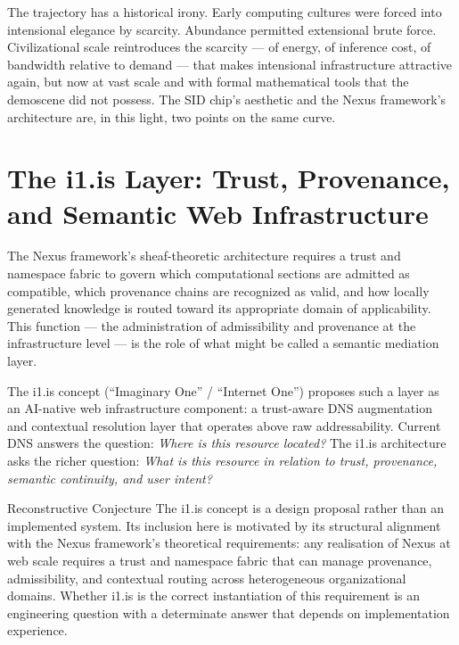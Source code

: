 The trajectory has a historical irony. Early computing
cultures were forced into intensional elegance by
scarcity. Abundance permitted extensional brute force.
Civilizational scale reintroduces the scarcity --- of
energy, of inference cost, of bandwidth relative to
demand --- that makes intensional infrastructure
attractive again, but now at vast scale and with
formal mathematical tools that the demoscene did not
possess. The SID chip's aesthetic and the Nexus framework's
architecture are, in this light, two points on the
same curve.

\section{The i1.is Layer: Trust, Provenance, and Semantic Web Infrastructure}
\label{sec:i1-layer}

The Nexus framework's sheaf-theoretic architecture
requires a trust and namespace fabric to govern which
computational sections are admitted as compatible,
which provenance chains are recognized as valid, and
how locally generated knowledge is routed toward its
appropriate domain of applicability. This function
--- the administration of admissibility and provenance
at the infrastructure level --- is the role of what
might be called a semantic mediation layer.

The i1.is concept (``Imaginary One'' / ``Internet One'')
proposes such a layer as an AI-native web infrastructure
component: a trust-aware DNS augmentation and contextual
resolution layer that operates above raw addressability.
Current DNS answers the question: \emph{Where is this
resource located?} The i1.is architecture asks the
richer question: \emph{What is this resource in relation
to trust, provenance, semantic continuity, and user intent?}

\begin{epistemicstatus}{Reconstructive Conjecture}
The i1.is concept is a design proposal rather than
an implemented system. Its inclusion here is motivated
by its structural alignment with the Nexus framework's
theoretical requirements: any realisation of Nexus
at web scale requires a trust and namespace fabric
that can manage provenance, admissibility, and contextual
routing across heterogeneous organizational domains.
Whether i1.is is the correct instantiation of this
requirement is an engineering question with a determinate
answer that depends on implementation experience.
\end{epistemicstatus}

